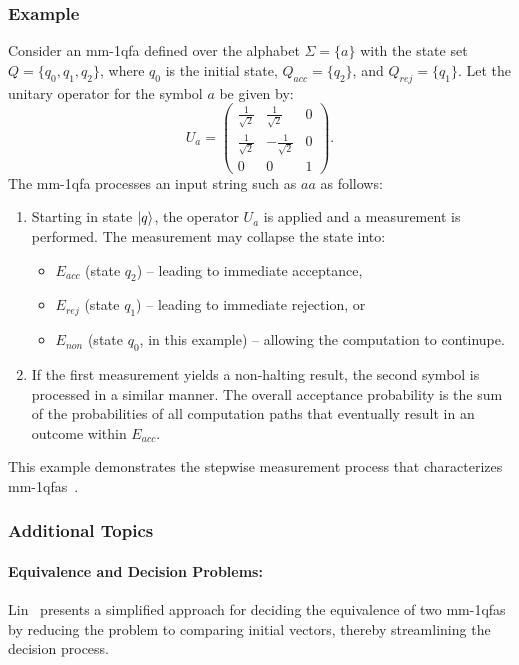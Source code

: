 \subsubsection{Example}
Consider an \gls{mm-1qfa} defined over the alphabet $\Sigma=\{a\}$ with the state set $Q=\{q_0,q_1,q_2\}$, where $q_0$ is the initial state, $Q_{acc}=\{q_2\}$, and $Q_{rej}=\{q_1\}$. Let the unitary operator for the symbol $a$ be given by:
\[
U_a = \begin{pmatrix}
\frac{1}{\sqrt{2}} & \frac{1}{\sqrt{2}} & 0 \\[1mm]
\frac{1}{\sqrt{2}} & -\frac{1}{\sqrt{2}} & 0 \\[1mm]
0 & 0 & 1
\end{pmatrix}.
\]
The \gls{mm-1qfa} processes an input string such as $aa$ as follows:
\begin{enumerate}
    \item Starting in state $\ket{q}$, the operator $U_a$ is applied and a measurement is performed. The measurement may collapse the state into:
    \begin{itemize}
        \item $E_{acc}$ (state $q_2$) – leading to immediate acceptance,
        \item $E_{rej}$ (state $q_1$) – leading to immediate rejection, or
        \item $E_{non}$ (state $q_0$, in this example) – allowing the computation to continupe.
    \end{itemize}
    \item If the first measurement yields a non-halting result, the second symbol is processed in a similar manner. The overall acceptance probability is the sum of the probabilities of all computation paths that eventually result in an outcome within $E_{acc}$.
\end{enumerate}
This example demonstrates the stepwise measurement process that characterizes \glspl{mm-1qfa}~\cite{kondacs1997power,lin2012another}.

\subsubsection{Additional Topics}
\paragraph{Equivalence and Decision Problems:} Lin~\cite{lin2012another} presents a simplified approach for deciding the equivalence of two \glspl{mm-1qfa} by reducing the problem to comparing initial vectors, thereby streamlining the decision process.

